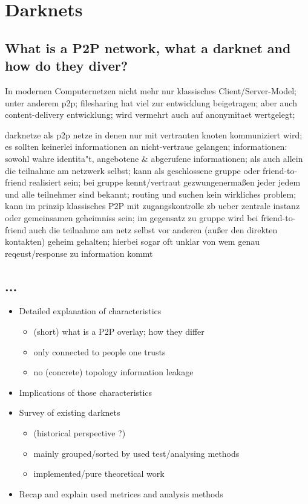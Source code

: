 \chapter{Darknets}

\section{What is a P2P network, what a darknet and how do they diver?}
In modernen Computernetzen nicht mehr nur klassisches Client/Server-Model; unter anderem p2p; filesharing hat viel zur entwicklung beigetragen; aber auch content-delivery entwicklung; wird vermehrt auch auf anonymitaet wertgelegt;

darknetze als p2p netze in denen nur mit vertrauten knoten kommuniziert wird; es sollten keinerlei informationen an nicht-vertraue gelangen; informationen: sowohl wahre identita"t, angebotene & abgerufene informationen; als auch allein die teilnahme am netzwerk selbst; kann als geschlossene gruppe oder friend-to-friend realisiert sein;
bei gruppe kennt/vertraut gezwungenermaßen jeder jedem und alle teilnehmer sind bekannt; routing und suchen kein wirkliches problem; kann im prinzip klassisches P2P mit zugangskontrolle zb ueber zentrale instanz oder gemeinsamen geheimniss sein;
im gegensatz zu gruppe wird bei friend-to-friend auch die teilnahme am netz selbst vor anderen (außer den direkten kontakten) geheim gehalten; hierbei sogar oft unklar von wem genau reqeust/response zu information kommt 


\section{...}
\begin{itemize}
\item    Detailed explanation of characteristics
\begin{itemize}
\item        (short) what is a P2P overlay; how they differ
\item        only connected to people one trusts
\item        no (concrete) topology information leakage
\end{itemize}
\item    Implications of those characteristics
\item    Survey of existing darknets
\begin{itemize}
\item        (historical perspective ?)
\item        mainly grouped/sorted by used test/analysing methods
\item        implemented/pure theoretical work
\end{itemize}
\item    Recap and explain used metrices and analysis methods
\end{itemize}
